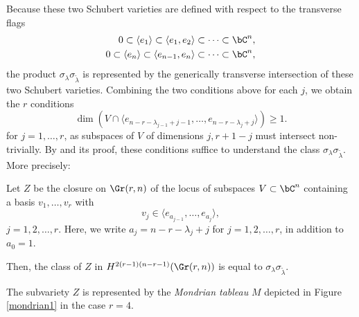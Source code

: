 Because these two Schubert varieties are defined with respect to the transverse flags
\begin{align*}
0\subset\langle e_1\rangle\subset\langle e_1,e_{2}\rangle\subset\cdots\subset\bC^n,\\
0\subset\langle e_{n}\rangle\subset\langle e_{n-1},e_{n}\rangle\subset\cdots\subset\bC^n,
\end{align*}
the product $\sigma_{\lambda}\sigma_{\widetilde{\lambda}}$ is represented by the generically transverse intersection of these two Schubert varieties. Combining the two conditions above for each $j$, we obtain the $r$ conditions
\begin{equation*}
\dim(V\cap\langle e_{n-r-\lambda_{j-1}+j-1},\ldots,e_{n-r-\lambda_j+j}\rangle)\ge 1.
\end{equation*}
for $j=1,\ldots,r$, as subspaces of $V$ of dimensions $j,r+1-j$ must intersect non-trivially. By \cite[Theorem 3.21]{Cos09} and its proof, these conditions suffice to understand the class $\sigma_\lambda\sigma_{\widetilde{\lambda}}$. More precisely:
\begin{prop}
Let $Z$ be the closure on $\Gr(r,n)$ of the locus of subspaces $V\subset\bC^n$ containing a basis $v_1,\ldots,v_r$ with 
\begin{equation*}
v_j\in \langle e_{a_{j-1}},\ldots,e_{a_j}\rangle,
\end{equation*}
$j=1,2,\ldots,r$. Here, we write $a_j=n-r-\lambda_j+j$ for $j=1,2,\ldots,r$, in addition to $a_0=1$.

Then, the class of $Z$ in $H^{2(r-1)(n-r-1)}(\Gr(r,n))$ is equal to $\sigma_\lambda\sigma_{\widetilde{\lambda}}$.
\end{prop}
The subvariety $Z$ is represented by the \emph{Mondrian tableau} $M$ depicted in Figure \ref{mondrian1} in the case $r=4$.
